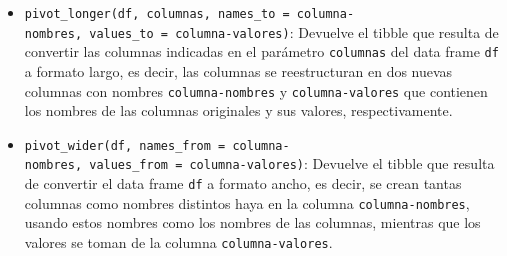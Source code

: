 \documentclass[
  spanish,
  a4paper,
]{scrreport}
\theoremstyle{definition}
\theoremstyle{definition}
\theoremstyle{remark}
\begin{document}
\begin{itemize}
\item
  \texttt{pivot\_longer(df,\ columnas,\ names\_to\ =\ columna-nombres,\ values\_to\ =\ columna-valores)}:
  Devuelve el tibble que resulta de convertir las columnas indicadas en
  el parámetro \texttt{columnas} del data frame \texttt{df} a formato
  largo, es decir, las columnas se reestructuran en dos nuevas columnas
  con nombres \texttt{columna-nombres} y \texttt{columna-valores} que
  contienen los nombres de las columnas originales y sus valores,
  respectivamente.
\item
  \texttt{pivot\_wider(df,\ names\_from\ =\ columna-nombres,\ values\_from\ =\ columna-valores)}:
  Devuelve el tibble que resulta de convertir el data frame \texttt{df}
  a formato ancho, es decir, se crean tantas columnas como nombres
  distintos haya en la columna \texttt{columna-nombres}, usando estos
  nombres como los nombres de las columnas, mientras que los valores se
  toman de la columna \texttt{columna-valores}.
\end{itemize}
\end{document}
